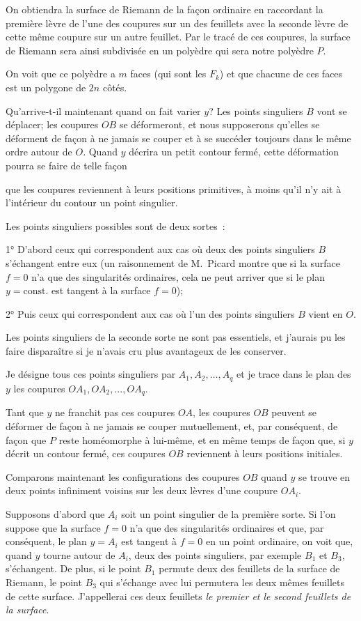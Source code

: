 \documentclass{article}
\begin{document}
On obtiendra la surface de Riemann de la façon ordinaire en raccordant la première lèvre de l'une des coupures sur un des feuillets avec la seconde lèvre de cette même coupure sur un autre feuillet. Par le tracé de ces coupures, la surface de Riemann sera ainsi subdivisée en un polyèdre qui sera notre polyèdre $P$.

On voit que ce polyèdre a $m$ faces (qui sont les $F_{k}$) et que chacune de ces faces est un polygone de $2n$ côtés.

Qu'arrive-t-il maintenant quand on fait varier $y$? Les points singuliers $B$ vont se déplacer; les coupures $OB$ se déformeront, et nous supposerons qu'elles se déforment de façon à ne jamais se couper et à se succéder toujours dans le même ordre autour de $O$. Quand $y$ décrira un petit contour fermé, cette déformation pourra se faire de telle façon

que les coupures reviennent à leurs positions primitives, à moins qu'il n'y ait à l'intérieur du contour un point singulier.

Les points singuliers possibles sont de deux sortes~:

1° D'abord ceux qui correspondent aux cas où deux des points singuliers $B$ s'échangent entre eux (un raisonnement de M.~Picard montre que si la surface $f = 0$ n'a que des singularités ordinaires, cela ne peut arriver que si le plan $y = \text{const.}$ est tangent à la surface $f = 0$);

2° Puis ceux qui correspondent aux cas où l'un des points singuliers $B$ vient en $O$.

Les points singuliers de la seconde sorte ne sont pas essentiels, et j'aurais pu les faire disparaître si je n'avais cru plus avantageux de les conserver.

Je désigne tous ces points singuliers par $A_{1}, A_{2}, \ldots, A_{q}$ et je trace dans le plan des $y$ les coupures $OA_{1}, OA_{2}, \ldots, OA_{q}$.

Tant que $y$ ne franchit pas ces coupures $OA$, les coupures $OB$ peuvent se déformer de façon à ne jamais se couper mutuellement, et, par conséquent, de façon que $P$ reste homéomorphe à lui-même, et en même temps de façon que, si $y$ décrit un contour fermé, ces coupures $OB$ reviennent à leurs positions initiales.

Comparons maintenant les configurations des coupures $OB$ quand $y$ se trouve en deux points infiniment voisins sur les deux lèvres d'une coupure $OA_{i}$.

Supposons d'abord que $A_{i}$ soit un point singulier de la première sorte. Si l'on suppose que la surface $f = 0$ n'a que des singularités ordinaires et que, par conséquent, le plan $y = A_{i}$ est tangent à $f = 0$ en un point ordinaire, on voit que, quand $y$ tourne autour de $A_{i}$, deux des points singuliers, par exemple $B_{1}$ et $B_{3}$, s'échangent. De plus, si le point $B_{1}$ permute deux des feuillets de la surface de Riemann, le point $B_{3}$ qui s'échange avec lui permutera les deux mêmes feuillets de cette surface. J'appellerai ces deux feuillets \emph{le premier et le second feuillets de la surface}.
\end{document}
